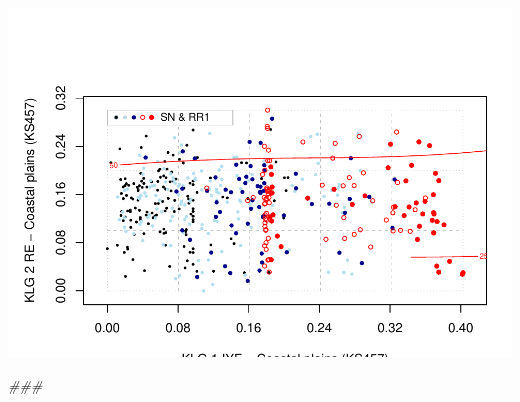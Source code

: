 \documentclass[]{article}
\newenvironment{Shaded}{\begin{snugshade}}{\end{snugshade}}
\newcommand{\CommentTok}[1]{\textcolor[rgb]{0.56,0.35,0.01}{\textit{#1}}}
\begin{document}
\includegraphics{Landscape_analysis_example_4_files/figure-latex/unnamed-chunk-46-1.pdf}

\begin{Shaded}
\begin{Highlighting}[]
\CommentTok{###}
\end{Highlighting}
\end{Shaded}
\end{document}
